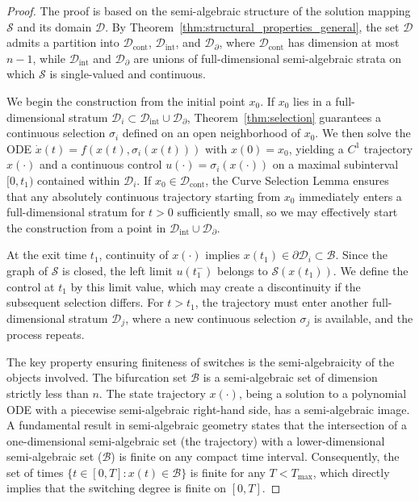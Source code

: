 \documentclass[sn-basic,Numbered]{sn-jnl}
\theoremstyle{thmstyleone}%
\begin{document}
\begin{proof}
The proof is based on the semi-algebraic structure of the solution mapping $\mathcal{S}$ and its domain $\mathcal{D}$. By Theorem~\ref{thm:structural_properties_general}, the set $\mathcal{D}$ admits a partition into $\mathcal{D}_{\mathrm{cont}}$, $\mathcal{D}_{\mathrm{int}}$, and $\mathcal{D}_{\partial}$, where $\mathcal{D}_{\mathrm{cont}}$ has dimension at most $n-1$, while $\mathcal{D}_{\mathrm{int}}$ and $\mathcal{D}_{\partial}$ are unions of full-dimensional semi-algebraic strata on which $\mathcal{S}$ is single-valued and continuous.

We begin the construction from the initial point $x_0$. If $x_0$ lies in a full-dimensional stratum $\mathcal{D}_i \subset \mathcal{D}_{\mathrm{int}} \cup \mathcal{D}_{\partial}$, Theorem~\ref{thm:selection} guarantees a continuous selection $\sigma_i$ defined on an open neighborhood of $x_0$. We then solve the ODE $\dot{x}(t) = f(x(t), \sigma_i(x(t)))$ with $x(0) = x_0$, yielding a $C^1$ trajectory $x(\cdot)$ and a continuous control $u(\cdot) = \sigma_i(x(\cdot))$ on a maximal subinterval $[0, t_1)$ contained within $\mathcal{D}_i$. If $x_0 \in \mathcal{D}_{\mathrm{cont}}$, the Curve Selection Lemma ensures that any absolutely continuous trajectory starting from $x_0$ immediately enters a full-dimensional stratum for $t > 0$ sufficiently small, so we may effectively start the construction from a point in $\mathcal{D}_{\mathrm{int}} \cup \mathcal{D}_{\partial}$.

At the exit time $t_1$, continuity of $x(\cdot)$ implies $x(t_1) \in \partial \mathcal{D}_i \subset \mathcal{B}$. Since the graph of $\mathcal{S}$ is closed, the left limit $u(t_1^-)$ belongs to $\mathcal{S}(x(t_1))$. We define the control at $t_1$ by this limit value, which may create a discontinuity if the subsequent selection differs. For $t > t_1$, the trajectory must enter another full-dimensional stratum $\mathcal{D}_j$, where a new continuous selection $\sigma_j$ is available, and the process repeats.

The key property ensuring finiteness of switches is the semi-algebraicity of the objects involved. The bifurcation set $\mathcal{B}$ is a semi-algebraic set of dimension strictly less than $n$. The state trajectory $x(\cdot)$, being a solution to a polynomial ODE with a piecewise semi-algebraic right-hand side, has a semi-algebraic image. A fundamental result in semi-algebraic geometry states that the intersection of a one-dimensional semi-algebraic set (the trajectory) with a lower-dimensional semi-algebraic set ($\mathcal{B}$) is finite on any compact time interval. Consequently, the set of times $\{ t \in [0, T] : x(t) \in \mathcal{B} \}$ is finite for any $T < T_{\max}$, which directly implies that the switching degree is finite on $[0, T]$.


\end{proof}
\end{document}
